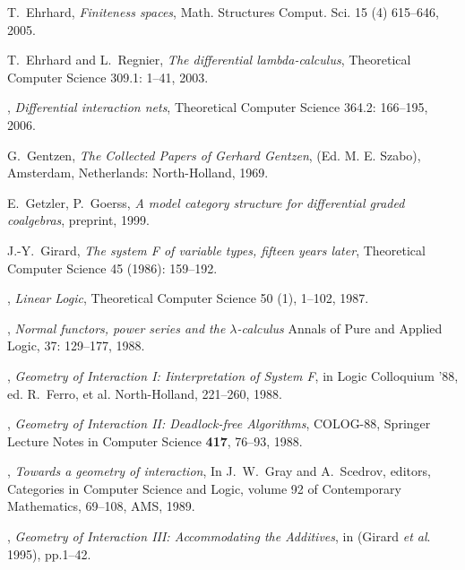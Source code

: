 \documentclass[english,letter paper,12pt,reqno]{article}
\theoremstyle{example}
\begin{document}
\begin{thebibliography}{BHLS03}

T.~Ehrhard, \textsl{Finiteness spaces}, Math. Structures Comput. Sci. 15 (4) 615--646, 2005.


T.~Ehrhard and L.~Regnier, \textsl{The differential lambda-calculus}, Theoretical Computer Science 309.1: 1--41, 2003.

\bysame, \textsl{Differential interaction nets}, Theoretical Computer Science 364.2: 166--195, 2006.

G.~Gentzen, \textsl{The Collected Papers of Gerhard Gentzen}, (Ed. M. E. Szabo), Amsterdam, Netherlands: North-Holland, 1969.

E.~Getzler, P.~Goerss, \emph{A model category structure for differential graded coalgebras}, preprint, 1999.
  
J.-Y.~Girard, \textsl{The system F of variable types, fifteen years later}, Theoretical Computer Science 45 (1986): 159--192.
  
\bysame, \textsl{Linear Logic}, Theoretical Computer Science 50 (1), 1--102, 1987.

\bysame, \textsl{Normal functors, power series and the $\lambda$-calculus} Annals of Pure and Applied
Logic, 37: 129--177, 1988.

\bysame, \textsl{Geometry of {I}nteraction I: {I}interpretation of {S}ystem {F}}, in Logic Colloquium '88, ed. R.~Ferro, et al. North-Holland, 221--260, 1988.

\bysame, \textsl{Geometry of {I}nteraction II: {D}eadlock-free {A}lgorithms}, COLOG-88, Springer Lecture Notes in Computer Science \textbf{417}, 76--93, 1988.

\bysame, \textsl{Towards a geometry of interaction}, In J.~W.~Gray and A.~Scedrov, editors, Categories in Computer Science and Logic, volume 92 of Contemporary Mathematics, 69--108, AMS, 1989.

\bysame, \textsl{Geometry of {I}nteraction III: {A}ccommodating the {A}dditives}, in (Girard \textsl{et al}. 1995), pp.1--42.


\end{thebibliography}
\end{document}
